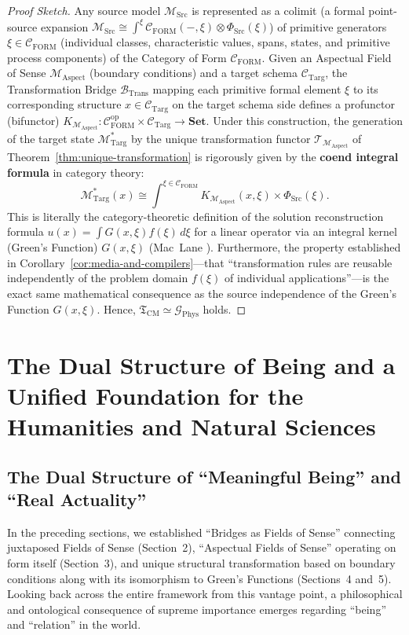 \documentclass[11pt,a4paper]{article}
\theoremstyle{definition}
\theoremstyle{plain}
\theoremstyle{remark}
\newcommand{\Set}{\mathbf{Set}}
\newcommand{\CFORM}{\mathcal{C}_{\mathrm{FORM}}}
\newcommand{\CTarg}{\mathcal{C}_{\mathrm{Targ}}}
\newcommand{\MSrc}{\mathcal{M}_{\mathrm{Src}}}
\newcommand{\MTarg}{\mathcal{M}_{\mathrm{Targ}}}
\newcommand{\MAspect}{\mathcal{M}_{\mathrm{Aspect}}}
\newcommand{\BTrans}{\mathcal{B}_{\mathrm{Trans}}}
\begin{document}
\begin{proof}[Proof Sketch]
Any source model $\MSrc$ is represented as a colimit (a formal point-source expansion $\MSrc \cong \int^{\xi} \CFORM(-, \xi) \otimes \Phi_{\mathrm{Src}}(\xi)$) of primitive generators $\xi \in \CFORM$ (individual classes, characteristic values, spans, states, and primitive process components) of the Category of Form $\CFORM$. Given an Aspectual Field of Sense $\MAspect$ (boundary conditions) and a target schema $\CTarg$, the Transformation Bridge $\BTrans$ mapping each primitive formal element $\xi$ to its corresponding structure $x \in \CTarg$ on the target schema side defines a profunctor (bifunctor) $K_{\MAspect} : \CFORM^{\mathrm{op}} \times \CTarg \to \Set$. Under this construction, the generation of the target state $\MTarg^*$ by the unique transformation functor $\mathcal{T}_{\MAspect}$ of Theorem~\ref{thm:unique-transformation} is rigorously given by the \textbf{coend integral formula} in category theory:
\begin{equation}
\MTarg^*(x) \cong \int^{\xi \in \CFORM} K_{\MAspect}(x, \xi) \times \Phi_{\mathrm{Src}}(\xi).
\end{equation}
This is literally the category-theoretic definition of the solution reconstruction formula $u(x) = \int G(x, \xi) f(\xi)\, d\xi$ for a linear operator via an integral kernel (Green's Function) $G(x, \xi)$ (Mac~Lane \cite{maclane1998}). Furthermore, the property established in Corollary~\ref{cor:media-and-compilers}---that ``transformation rules are reusable independently of the problem domain $f(\xi)$ of individual applications''---is the exact same mathematical consequence as the source independence of the Green's Function $G(x, \xi)$. Hence, $\mathfrak{T}_{\mathrm{CM}} \simeq \mathcal{G}_{\mathrm{Phys}}$ holds. \qedhere
\end{proof}

\section{The Dual Structure of Being and a Unified Foundation for the Humanities and Natural Sciences}

\subsection{The Dual Structure of ``Meaningful Being'' and ``Real Actuality''}
In the preceding sections, we established ``Bridges as Fields of Sense'' connecting juxtaposed Fields of Sense (Section~2), ``Aspectual Fields of Sense'' operating on form itself (Section~3), and unique structural transformation based on boundary conditions along with its isomorphism to Green's Functions (Sections~4 and~5). Looking back across the entire framework from this vantage point, a philosophical and ontological consequence of supreme importance emerges regarding ``being'' and ``relation'' in the world.
\end{document}
